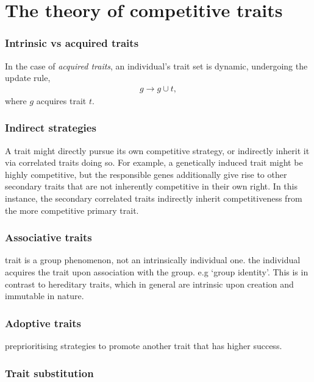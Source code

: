 \documentclass[twocolumn, aps, rmp, amsmath, amssymb, nofootinbib, superscriptaddress, longbibliography, floatfix, table-of-contents, eqsecnum]{revtex4-1}
\begin{document}
%
%

\part{The theory of competitive traits}

\section{Intrinsic vs acquired traits}

In the case of \textit{acquired traits}, an individual's trait set is dynamic, undergoing the update rule,
\begin{align}
	g\to g\cup t,	
\end{align}
where $g$ acquires trait $t$.

\section{Indirect strategies}

A trait might directly pursue its own competitive strategy, or indirectly inherit it via correlated traits doing so. For example, a genetically induced trait might be highly competitive, but the responsible genes additionally give rise to other secondary traits that are not inherently competitive in their own right. In this instance, the secondary correlated traits indirectly inherit competitiveness from the more competitive primary trait.

\section{Associative traits}

trait is a group phenomenon, not an intrinsically individual one. the individual acquires the trait upon association with the group. e.g `group identity'. This is in contrast to hereditary traits, which in general are intrinsic upon creation and immutable in nature.

\section{Adoptive traits}

preprioritising strategies to promote another trait that has higher success.

\section{Trait substitution}
\end{document}
